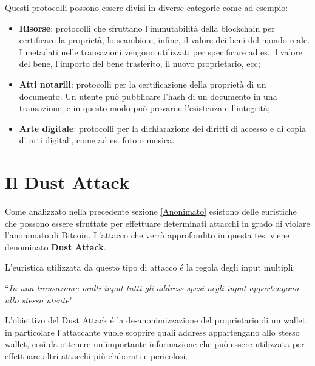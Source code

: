 Questi protocolli possono essere divisi in diverse categorie come ad esempio:
\begin{itemize}
    \item \textbf{Risorse}: protocolli che sfruttano l'immutabilità della blockchain per certificare la proprietà, lo scambio e, infine, il valore dei beni del mondo reale. I metadati nelle transazioni vengono utilizzati per specificare ad es. il valore del bene, l'importo del bene trasferito, il nuovo proprietario, ecc;  
    \item \textbf{Atti notarili}: protocolli per la certificazione della proprietà di un documento. Un utente può pubblicare l'hash di un documento in una transazione, e in questo modo può provarne l'esistenza e l'integrità;
    \item \textbf{Arte digitale}: protocolli per la dichiarazione dei diritti di accesso e di copia di arti digitali, come ad es. foto o musica.
\end{itemize}

\section{Il Dust Attack}\label{dstatt}
Come analizzato nella precedente sezione \ref{Anonimato} esistono delle euristiche che possono essere sfruttate per effettuare determinati attacchi in grado di violare l'anonimato di Bitcoin. L'attacco che verrà approfondito in questa tesi viene denominato \textbf{Dust Attack}. 

L'euristica utilizzata da questo tipo di attacco é la regola degli input multipli:
\begin{center}
    ``\textit{In una transazione multi-input tutti gli address spesi negli input appartengono allo stesso utente}"
\end{center}
L'obiettivo del Dust Attack é la de-anonimizzazione del proprietario di un wallet, in particolare l'attaccante vuole scoprire quali address appartengano allo stesso wallet, così da ottenere un'importante informazione che può essere utilizzata per effettuare altri attacchi più elaborati e pericolosi.

